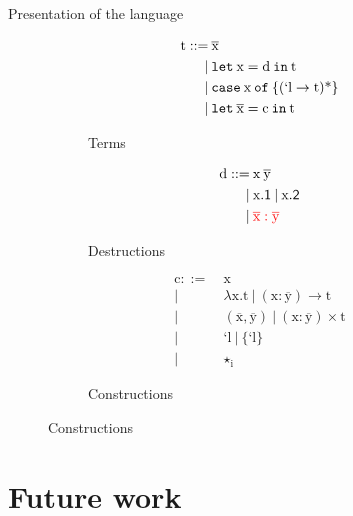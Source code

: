 \documentclass[xcolor=svgnames,11pt]{beamer}
\begin{document}
\begin{frame}[shrink]{Presentation of the language}
\begin{figure}[!h]
  \begin{subfigure}[b]{0.3\linewidth{}}
    \begin{align*}
      \ensuremath{\text{t}} ::=\:&\ensuremath{\overline{\text{x}}}\\ |\:&\ensuremath{\text{\texttt{let}}\:\text{x}=\text{d}\:\text{\texttt{in}}\:\text{t}}\\ |\:&\ensuremath{\text{\texttt{case}}\:\text{x}\:\text{\texttt{of}}\:\{\text{\ensuremath{(\text{`l}\to{}\text{t})}\ensuremath{\text{*}}}\}}\\ |\:&\ensuremath{\text{\texttt{let}}\:\overline{\text{x}}=\text{c}\:\text{\texttt{in}}\:\text{t}}
    \end{align*}
    \caption{Terms}
  \end{subfigure}
  \begin{subfigure}[b]{0.25\linewidth{}}
    \begin{align*}
      \ensuremath{\text{d}} ::=\:&\ensuremath{\text{x}} \: \ensuremath{\overline{\text{y}}}\\ |\:&\ensuremath{\text{x}\mathsf{.1}} \: | \: \ensuremath{\text{x}\mathsf{.2}} \\ |\:&\textcolor{red}{\ensuremath{\overline{\text{x}}:\overline{\text{y}}}}
    \end{align*}
    \caption{Destructions}
  \end{subfigure}
  \begin{subfigure}[b]{0.3\linewidth{}}
    \begin{align*}
      \ensuremath{\text{c}} ::=\:&\ensuremath{\text{x}}\\|\:&\ensuremath{\lambda{{}}} \ensuremath{\text{x}} . \ensuremath{\text{t}}\:|\:\ensuremath{(\text{x}:\overline{\text{y}})\to{}\text{t}}\\|\:&(\ensuremath{\overline{\text{x}}},\ensuremath{\overline{\text{y}}})\:|\:\ensuremath{(\text{x}:\overline{\text{y}})\times{}\text{t}}\\|\:&\ensuremath{\text{`l}}\:|\:\ensuremath{\{\text{`l}\}}\\|\:&\ensuremath{\star{}} \ensuremath{_{\text{i}}}
    \end{align*}\caption{Constructions}
  \end{subfigure}
\end{figure}
\end{frame}


\section{Future work}
\end{document}
